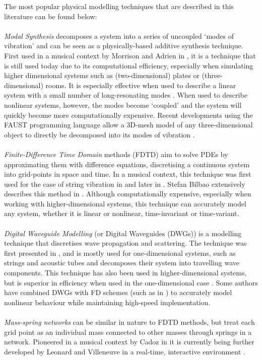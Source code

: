 The most popular physical modelling techniques that are described in this literature can be found below:
\\
\\
\textit{Modal Synthesis} decomposes a system into a series of uncoupled `modes of vibration' and can be seen as a physically-based additive synthesis technique. First used in a musical context by Morrison and Adrien in \cite{Morrison1993}, it is a technique that is still used today due to its computational efficiency, especially when simulating higher dimensional systems such as (two-dimensional) plates or (three-dimensional) rooms. It is especially effective when used to describe a linear system with a small number of long-resonating modes \cite{Bilbao2018, Smith2010a}. When used to describe nonlinear systems, however, the modes become `coupled’ and the system will quickly become more computationally expensive. Recent developments using the FAUST programming language allow a 3D-mesh model of any three-dimensional object to directly be decomposed into its modes of vibration \cite{MichonMesh2Faust2017}.
\\
\\
\textit{Finite-Difference Time Domain} methods (FDTD) aim to solve PDEs by approximating them with difference equations, discretising a continuous system into grid-points in space and time. In a musical context, this technique was first used for the case of string vibration in \cite{Ruiz1969, Hiller1971I, Hiller1971II} and later in \cite{Chaigne1992, Chaigne1994}. Stefan Bilbao extensively describes this method in \cite{theBible, Bilbao2018}. Although computationally expensive, especially when working with higher-dimensional systems, this technique can accurately model any system, whether it is linear or nonlinear, time-invariant or time-variant.
\\
\\
\textit{Digital Waveguide Modelling} (or Digital Waveguides (DWGs)) is a modelling technique that discretises wave propagation and scattering. The technique was first presented in \cite{Smith1992}, and is mostly used for one-dimensional systems, such as strings and acoustic tubes and decomposes their system into travelling wave components. This technique has also been used in higher-dimensional systems, but is superior in efficiency when used in the one-dimensional case \cite{Valimaki2006}. Some authors have combined DWGs with FD schemes (such as in \cite{Erkut2002, Maestre2014}) to accurately model nonlinear behaviour while maintaining high-speed implementation.
\\
\\
\textit{Mass-spring networks} can be similar in nature to FDTD methods, but treat each grid point as an individual mass connected to other masses through springs in a network. Pioneered in a musical context by Cadoz in \cite{Cadoz1979, Cadoz1983, Cadoz1993} it is currently being further developed by Leonard and Villeneuve in a real-time, interactive environment \cite{Villeneuve2019, Leonard2019}.


